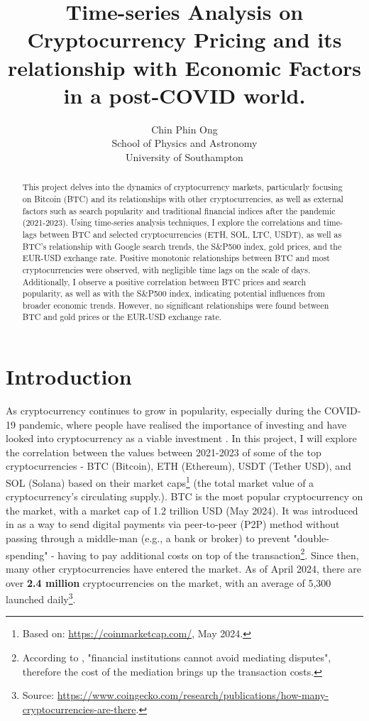 \documentclass[a4paper, 10pt, conference]{ieeeconf}      %
\title{\LARGE \bf
Time-series Analysis on Cryptocurrency Pricing and its relationship with Economic Factors in a post-COVID world.
}
\author{ \parbox{3 in}{\centering Chin Phin Ong\\
          School of Physics and Astronomy\\
          University of Southampton}}
\begin{document}
\maketitle
\thispagestyle{empty}
\pagestyle{empty}

\begin{abstract}

This project delves into the dynamics of cryptocurrency markets, particularly focusing on Bitcoin (BTC) and its relationships with other cryptocurrencies, as well as external factors such as search popularity and traditional financial indices after the pandemic (2021-2023). Using time-series analysis techniques, I explore the correlations and time-lags between BTC and selected cryptocurrencies (ETH, SOL, LTC, USDT), as well as BTC's relationship with Google search trends, the S\&P500 index, gold prices, and the EUR-USD exchange rate. Positive monotonic relationships between BTC and most cryptocurrencies were observed, with negligible time lags on the scale of days. Additionally, I observe a positive correlation between BTC prices and search popularity, as well as with the S\&P500 index, indicating potential influences from broader economic trends. However, no significant relationships were found between BTC and gold prices or the EUR-USD exchange rate.

\end{abstract}

\section{Introduction}
As cryptocurrency continues to grow in popularity, especially during the COVID-19 pandemic, where people have realised the importance of investing and have looked into cryptocurrency as a viable investment \cite{Corbet2018}. In this project, I will explore the correlation between the values between 2021-2023 of some of the top cryptocurrencies - BTC (Bitcoin), ETH (Ethereum), USDT (Tether USD), and SOL (Solana) based on their market caps\footnote{Based on: \url{https://coinmarketcap.com/}, May 2024.} (the total market value of a cryptocurrency's circulating supply.). BTC is the most popular cryptocurrency on the market, with a market cap of 1.2 trillion USD (May 2024). It was introduced in \cite{Nakamoto2008} as a way to send digital payments via peer-to-peer (P2P) method without passing through a middle-man (e.g., a bank or broker) to prevent "double-spending" - having to pay additional costs on top of the transaction\footnote{According to \cite{Nakamoto2008}, "financial institutions cannot avoid mediating disputes", therefore the cost of the mediation brings up the transaction costs.}. Since then, many other cryptocurrencies have entered the market. As of April 2024, there are over \textbf{2.4 million} cryptocurrencies on the market, with an average of 5,300 launched daily\footnote{Source: \url{https://www.coingecko.com/research/publications/how-many-cryptocurrencies-are-there}.}.
\end{document}
